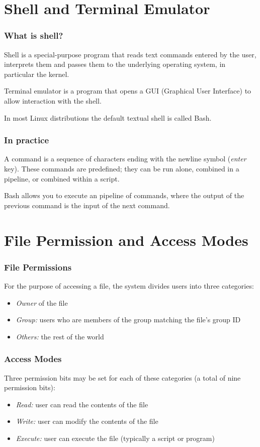\documentclass{beamer}
\begin{document}
\section{Shell and Terminal Emulator}
\begin{frame}
\frametitle{What is shell?}
\begin{definition}
\alert{Shell} is a special-purpose program that reads text commands entered by the user, interprets them and passes them to the underlying operating system, in particular the kernel.
\end{definition}

\begin{definition}
\alert{Terminal emulator} is a program that opens a GUI (Graphical User Interface) to allow interaction with the shell.
\end{definition}

In most Linux distributions the default textual shell is called \alert{Bash}.
\end{frame}

\begin{frame}
\frametitle{In practice}
A command is a sequence of characters ending with the newline symbol (\emph{enter} key). These commands are predefined; they can be run alone, combined in a pipeline, or combined within a script.
\newline

Bash allows you to execute an \alert{pipeline} of commands, where the output of the previous command is the input of the next command.
\end{frame}

\section{File Permission and Access Modes}
\begin{frame}
\frametitle{File Permissions}
For the purpose of accessing a file, the system divides users into three categories:
\begin{itemize}
\item \emph{Owner} of the file
\item \emph{Group:} users who are members of the group matching the file’s group ID
\item \emph{Others:} the rest of the world
\end{itemize}
\end{frame}

\begin{frame}
\frametitle{Access Modes}
Three permission bits may be set for each of these categories (a total of nine permission bits):
\begin{itemize}
\item \emph{Read:} user can read the contents of the file
\item \emph{Write:} user can modify the contents of the file
\item \emph{Execute:} user can execute the file (typically a script or program)
\end{itemize}
\end{frame}
\end{document}

